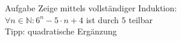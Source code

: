 \begin{frame}{Aufgabe}
	Zeige mittels vollständiger Induktion:\\
	$\forall n\in\mathbb{N}: 6^{n}-5\cdot n+4$ ist durch $5$ teilbar\\
	Tipp: quadratische Ergänzung\\
\end{frame}
